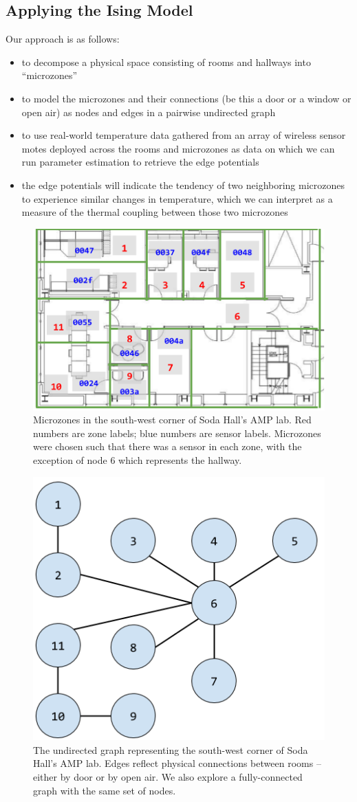 \subsection{Applying the Ising Model}

Our approach is as follows:

\begin{itemize}
\item to decompose a physical space consisting of rooms and hallways into ``microzones''
\item to model the microzones and their connections (be this a door or a window or open air) as nodes and edges in a pairwise undirected graph
\item to use real-world temperature data gathered from an array of wireless sensor motes deployed across the rooms and microzones as data on which we can run parameter estimation to retrieve the edge potentials
\item the edge potentials will indicate the tendency of two neighboring microzones to experience similar changes in temperature, which we can interpret as a measure of the thermal coupling between those two microzones
\end{itemize}

\begin{figure}
\centering
\includegraphics[width=.5\linewidth]{figs/Soda_AMP_microzones}
\caption{Microzones in the south-west corner of Soda Hall's AMP lab. Red numbers are zone labels; blue numbers are sensor labels. Microzones were chosen such that there was a sensor in each zone, with the exception of node 6 which represents the hallway.}
\label{fig:soda_amp_microzones}
\end{figure}


\begin{figure}
\centering
\includegraphics[width=.5\linewidth]{figs/SodaEdgeGraph}
\caption{The undirected graph representing the south-west corner of Soda Hall's AMP lab. Edges reflect physical connections between rooms -- either by door or by open air. We also explore a fully-connected graph with the same set of nodes.}
\label{fig:physical_soda_edges}
\end{figure}


